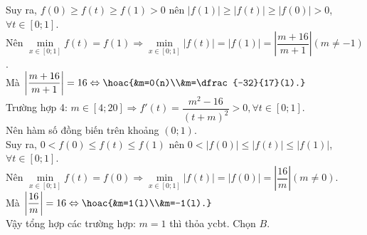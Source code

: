 \begin{ex}
{        Suy ra, $f(0)\geq f(t)\geq f(1)>0$ nên $\left|f(1)\right|\geq\left|f(t)\right|\geq\left|f(0)\right|>0$, $\forall t\in[0;1]$.\\
        Nên $\min\limits_{x\in[0;1]} f(t)=f(1)\Rightarrow\min\limits_{x\in[0;1]}\left|f(t)\right|=\left|f(1)\right|=\left|\dfrac{m+16}{m+1}\right|(m\neq-1)$.\\
        Mà $\left|\dfrac{m+16}{m+1}\right|=16\Leftrightarrow\hoac{&m=0(n)\\&m=\dfrac{-32}{17}(l).}$ \\
        Trường hợp 4: $m\in[4;20]\Rightarrow f'(t)=\dfrac{m^2-16}{(t+m)^2} >0,\forall t\in[0;1]$.\\
        Nên hàm số đồng biến trên khoảng $(0;1)$.\\
        Suy ra, $0<f(0)\leq f(t)\leq f(1)$ nên $0<\left|f(0)\right|\leq\left|f(t)\right|\leq\left|f(1)\right|$, $\forall t\in[0;1]$.\\
        Nên $\min\limits_{x\in[0;1]} f(t)=f(0)\Rightarrow\min\limits_{x\in[0;1]}\left|f(t)\right|=\left|f(0)\right|=\left|\dfrac{16}{m}\right|(m\neq 0)$.\\
        Mà $\left|\dfrac{16}{m}\right|=16\Leftrightarrow\hoac{&m=1(l)\\&m=-1(l).}$ \\
        Vậy tổng hợp các trường hợp: $m=1$ thì thỏa ycbt. Chọn $B$.
    }
\end{ex}
